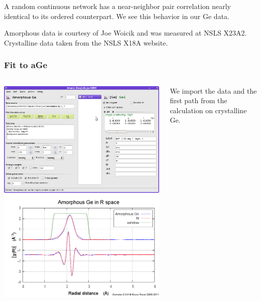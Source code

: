 \documentclass[10pt, xcolor=x11names, compress]{beamer}
\begin{document}
\begin{frame}
\begin{columns}
\begin{column}{0.33\linewidth}
    \end{column}
  \end{columns}

  \bigskip

  A random continuous network has a near-neighbor pair correlation
  nearly identical to its ordered counterpart.  We see this behavior
  in our Ge data.
  \begin{bottomnote}[0.5][19.25]
    Amorphous data is courtesy of Joe Woicik and was measured at NSLS
    X23A2.  Crystalline data taken from the NSLS X18A website.
  \end{bottomnote}
  
\end{frame}

\begin{frame}[fragile]
  \frametitle{Fit to aGe}
  \begin{columns}
    \begin{column}{0.4\linewidth}
      \includegraphics[width=\linewidth]{images/aGe_fit.png}\\[2ex]
      \includegraphics[width=\linewidth]{images/aGe_fit_chir.png}
    \end{column}
    \begin{column}{0.6\linewidth}
      We import the data and the first path from the {\feff}
      calculation on crystalline Ge.


\end{column}
\end{columns}
\end{frame}
\end{document}
